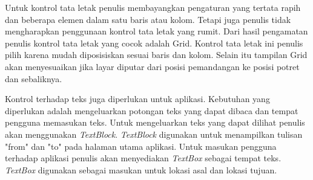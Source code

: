 Untuk kontrol tata letak penulis membayangkan pengaturan yang tertata rapih dan beberapa elemen dalam satu baris atau kolom. Tetapi juga penulis tidak mengharapkan penggunaan kontrol tata letak yang rumit. Dari hasil pengamatan penulis kontrol tata letak yang cocok adalah Grid. Kontrol tata letak ini penulis pilih karena mudah diposisiskan sesuai baris dan kolom. Selain itu tampilan Grid akan menyesuaikan jika layar diputar dari posisi pemandangan ke posisi potret dan sebaliknya.

Kontrol terhadap teks juga diperlukan untuk aplikasi. Kebutuhan yang diperlukan adalah mengeluarkan potongan teks yang dapat dibaca dan tempat pengguna memasukan teks. Untuk mengeluarkan teks yang dapat dilihat penulis akan menggunakan \textit{TextBlock}. \textit{TextBlock} digunakan untuk menampilkan tulisan "from" dan "to" pada halaman utama aplikasi. Untuk masukan pengguna terhadap aplikasi penulis akan menyediakan \textit{TextBox} sebagai tempat teks. \textit{TextBox} digunakan sebagai masukan untuk lokasi asal dan lokasi tujuan.


